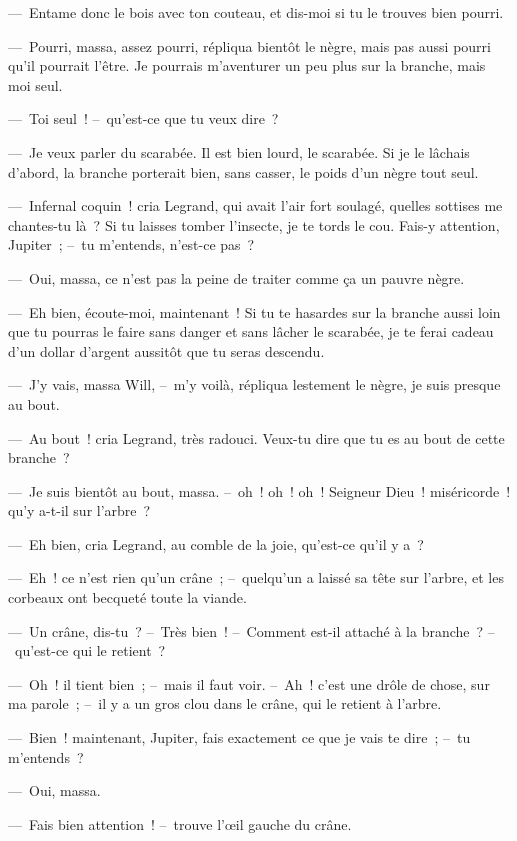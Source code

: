 \documentclass[french,twoside]{book} %
\begin{document}
— Entame donc le bois avec ton couteau, et dis-moi si tu le trouves bien pourri.\par
— Pourri, massa, assez pourri, répliqua bientôt le nègre, mais pas aussi pourri qu’il pourrait l’être. Je pourrais m’aventurer un peu plus sur la branche, mais moi seul.\par
— Toi seul ! – qu’est-ce que tu veux dire ?\par
— Je veux parler du scarabée. Il est bien lourd, le scarabée. Si je le lâchais d’abord, la branche porterait bien, sans casser, le poids d’un nègre tout seul.\par
— Infernal coquin ! cria Legrand, qui avait l’air fort soulagé, quelles sottises me chantes-tu là ? Si tu laisses tomber l’insecte, je te tords le cou. Fais-y attention, Jupiter ; – tu m’entends, n’est-ce pas ?\par
— Oui, massa, ce n’est pas la peine de traiter comme ça un pauvre nègre.\par
— Eh bien, écoute-moi, maintenant ! Si tu te hasardes sur la branche aussi loin que tu pourras le faire sans danger et sans lâcher le scarabée, je te ferai cadeau d’un dollar d’argent aussitôt que tu seras descendu.\par
— J’y vais, massa Will, – m’y voilà, répliqua lestement le nègre, je suis presque au bout.\par
— Au bout ! cria Legrand, très radouci. Veux-tu dire que tu es au bout de cette branche ?\par
— Je suis bientôt au bout, massa. – oh ! oh ! oh ! Seigneur Dieu ! miséricorde ! qu’y a-t-il sur l’arbre ?\par
— Eh bien, cria Legrand, au comble de la joie, qu’est-ce qu’il y a ?\par
— Eh ! ce n’est rien qu’un crâne ; – quelqu’un a laissé sa tête sur l’arbre, et les corbeaux ont becqueté toute la viande.\par
— Un crâne, dis-tu ? – Très bien ! – Comment est-il attaché à la branche ? – qu’est-ce qui le retient ?\par
— Oh ! il tient bien ; – mais il faut voir. – Ah ! c’est une drôle de chose, sur ma parole ; – il y a un gros clou dans le crâne, qui le retient à l’arbre.\par
— Bien ! maintenant, Jupiter, fais exactement ce que je vais te dire ; – tu m’entends ?\par
— Oui, massa.\par
— Fais bien attention ! – trouve l’œil gauche du crâne.\par
\end{document}
